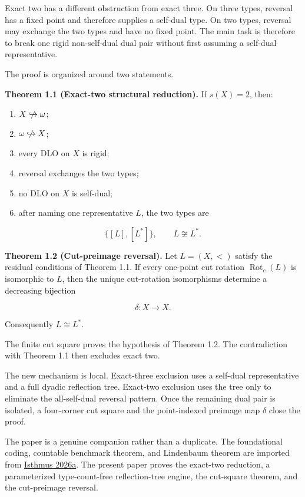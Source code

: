 \documentclass[
  english,
  11pt,
  reqno]{amsart}
\providecommand{\tightlist}{%
  \setlength{\itemsep}{0pt}\setlength{\parskip}{0pt}}
\providecommand{\nhookrightarrow}{\centernot\hookrightarrow}
\begin{document}
Exact two has a different obstruction from exact three. On three types,
reversal has a fixed point and therefore supplies a self-dual type. On
two types, reversal may exchange the two types and have no fixed point.
The main task is therefore to break one rigid non-self-dual dual pair
without first assuming a self-dual representative.

The proof is organized around two statements.

\protect{}\label{thm:intro-reduction}

\textbf{Theorem 1.1 (Exact-two structural reduction).} If \(s(X)=2\),
then:

\begin{enumerate}
\tightlist
\item
  \(X\nhookrightarrow\omega\);
\item
  \(\omega\nhookrightarrow X\);
\item
  every DLO on \(X\) is rigid;
\item
  reversal exchanges the two types;
\item
  no DLO on \(X\) is self-dual;
\item
  after naming one representative \(L\), the two types are
\end{enumerate}

\[
   \{[L],[L^*]\},
   \qquad
   L\not\cong L^*.
\]

\protect{}\label{thm:intro-cut-reversal}

\textbf{Theorem 1.2 (Cut-preimage reversal).} Let \(L=(X,<)\) satisfy
the residual conditions of Theorem 1.1. If every one-point cut rotation
\(\operatorname{Rot}_c(L)\) is isomorphic to \(L\), then the unique
cut-rotation isomorphisms determine a decreasing bijection

\[
\delta:X\longrightarrow X.
\]

Consequently \(L\cong L^*\).

The finite cut square proves the hypothesis of Theorem 1.2. The
contradiction with Theorem 1.1 then excludes exact two.

The new mechanism is local. Exact-three exclusion uses a self-dual
representative and a full dyadic reflection tree. Exact-two exclusion
uses the tree only to eliminate the all-self-dual reversal pattern. Once
the remaining dual pair is isolated, a four-corner cut square and the
point-indexed preimage map \(\delta\) close the proof.

The paper is a genuine companion rather than a duplicate. The
foundational coding, countable benchmark theorem, and Lindenbaum theorem
are imported from \hyperref[ref:isthmus2026a]{Isthmus 2026a}. The
present paper proves the exact-two reduction, a parameterized
type-count-free reflection-tree engine, the cut-square theorem, and the
cut-preimage reversal.
\end{document}
